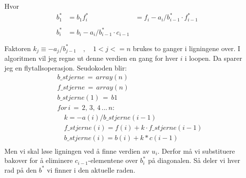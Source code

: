 \documentclass[a4paper,10pt,norsk]{article}
\begin{document}
Hvor 
\begin{align*}
b_1^*&=b_1
f_i^*&= f_i- a_i/b_{i-1}^* \cdot f_{i-1}^*\\\\
b_{i}^*&= b_{i}-a_{i}/b_{i-1}^*\cdot c_{i-1}\\\\
\end{align*}
Faktoren $k_j \equiv -a_j/b_{j-1}^*\quad , \quad 1<j<=n$ brukes to ganger i ligningene over. I algoritmen vil jeg regne ut denne verdien en gang for hver $i$ i loopen. Da sparer jeg en flytallsoperasjon. Seudokoden blir:
\begin{align*}
&b\_stjerne\, =\, array(n)\\
&f\_stjerne\, =\, array(n)\\
&b\_stjerne(1)\, =\, b1\\
&for\, i\,=\,2,\, 3,\, 4 \, ...\,  n:\\
&\quad k=-a(i)/b\_stjerne(i-1)\\
&\quad f\_stjerne(i)= f(i)+k \cdot f\_stjerne(i-1)\\
&\quad b\_stjerne(i)= b(i)+k*c(i-1)\\
\end{align*}
Men vi skal løse ligningen ved å finne verdien av $u_i$. Derfor må vi substituere bakover for å eliminere $c_{i-1}$-elementene over $b_i^*$ på diagonalen. Så deler vi hver rad på den $b^*$ vi finner i den aktuelle raden. 
\end{document}
